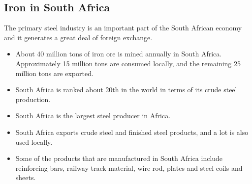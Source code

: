 \subsection{Iron in South Africa}

The primary steel industry is an important part of the South African economy and it generates a great deal of foreign exchange.

\begin{itemize}
\item{About 40 million tons of iron ore is mined annually in South Africa. Approximately 15 million tons are consumed locally, and the remaining 25 million tons are exported.}
\item{South Africa is ranked about 20th in the world in terms of its crude steel production.}
\item{South Africa is the largest steel producer in Africa.}
\item{South Africa exports crude steel and finished steel products, and a lot is also used locally.}
\item{Some of the products that are manufactured in South Africa include reinforcing bars, railway track material, wire rod, plates and steel coils and sheets.}
\end{itemize}




